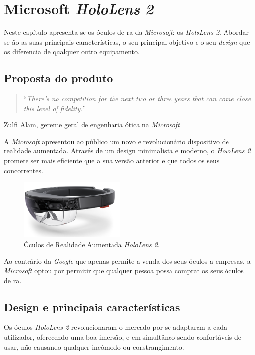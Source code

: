 \documentclass{report}
\begin{document}
\chapter{Microsoft \textit{HoloLens 2}}
\label{chap.microsoft-hololens-2}
Neste capítulo apresenta-se os óculos de \ac{ra} da \textit{Microsoft}: os \textit{HoloLens 2}. Abordar-se-ão as suas principais características, o seu principal objetivo e o seu \textit{design} que os diferencia de qualquer outro equipamento.

\section{Proposta do produto}
\begin{quote}
    ``\emph{There’s no competition for the next two or three years that can come close this level of fidelity.}''\cite{bohn_2019}
\end{quote}
\begin{flushright}
    Zulfi Alam, gerente geral de engenharia ótica na \textit{Microsoft}
\end{flushright}

A \textit{Microsoft} apresentou ao público um novo e revolucionário dispositivo de realidade aumentada. Através de um design minimalista e moderno, o \textit{HoloLens 2} promete ser mais eficiente que a sua versão anterior e que todos os seus concorrentes.

\begin{figure}[H]
    \centering
    \includegraphics[width=14em]{hololens2.png}
    \caption{Óculos de Realidade Aumentada \textit{HoloLens 2}.}
    \label{Fig:hololens2}
\end{figure}


Ao contrário da \textit{Google} que apenas permite a venda dos seus óculos a empresas, a \textit{Microsoft} optou por permitir que qualquer pessoa possa comprar os seus óculos de \ac{ra}.

\section{Design e principais características}
Os óculos \textit{HoloLens 2} revolucionaram o mercado por se adaptarem a cada utilizador, oferecendo uma boa imersão, e em simultâneo sendo confortáveis de usar, não causando qualquer incómodo ou constrangimento.
\end{document}
